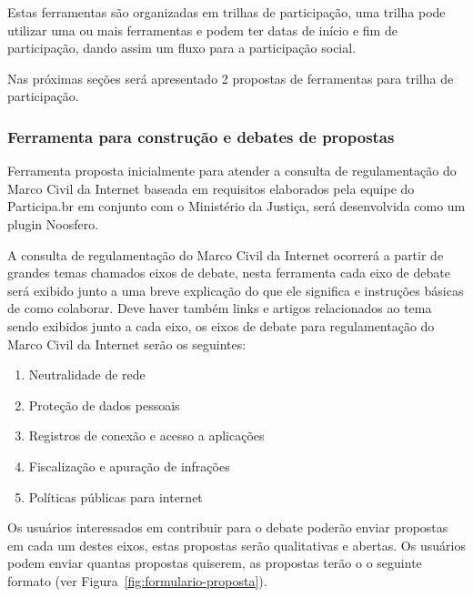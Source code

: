 \documentclass[12pt]{article}
\begin{document}
Estas ferramentas são organizadas em trilhas de participação, uma trilha
pode utilizar uma ou mais ferramentas e podem ter datas de início e fim de
participação, dando assim um fluxo para a participação social.

Nas próximas seções será apresentado 2 propostas de ferramentas para trilha de
participação.

\subsubsection{Ferramenta para construção e debates de propostas}

Ferramenta proposta inicialmente para atender a consulta de regulamentação do
Marco Civil da Internet baseada em requisitos elaborados pela equipe do
Participa.br em conjunto com o Ministério da Justiça, será desenvolvida como
um plugin Noosfero.

A consulta de regulamentação do Marco Civil da Internet ocorrerá a partir de
grandes temas chamados eixos de debate, nesta ferramenta cada eixo de debate
será exibido junto a uma breve explicação do que ele significa e instruções
básicas de como colaborar. Deve haver também links e artigos relacionados ao
tema sendo exibidos junto a cada eixo, os eixos de debate para regulamentação
do Marco Civil da Internet serão os seguintes:

\begin{enumerate}
  \item Neutralidade de rede
  \item Proteção de dados pessoais
  \item Registros de conexão e acesso a aplicações
  \item Fiscalização e apuração de infrações
  \item Políticas públicas para internet
\end{enumerate}

Os usuários interessados em contribuir para o debate poderão enviar propostas
em cada um destes eixos, estas propostas serão qualitativas e abertas. Os
usuários podem enviar quantas propostas quiserem, as propostas terão o
o seguinte formato (ver Figura~\ref{fig:formulario-proposta}).
\end{document}
